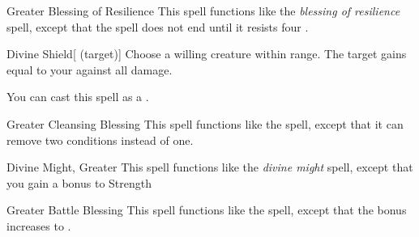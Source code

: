 \lowercase{\hypertarget{spell:Greater Blessing of Resilience}{}}\label{spell:Greater Blessing of Resilience}
\begin{ability}[\nth{3}]{\hypertarget{spell:Greater Blessing of Resilience}{Greater Blessing of Resilience}}
This spell functions like the \textit{blessing of resilience} spell, except that the spell does not end until it resists four .
\end{ability}
\vspace{0.25em}



\lowercase{\hypertarget{spell:Divine Shield}{}}\label{spell:Divine Shield}
\begin{ability}[\nth{4}]{\hypertarget{spell:Divine Shield}{Divine Shield}}[ (target)]
Choose a willing creature within \rngclose range.
The target gains  equal to your  against all damage.

You can cast this spell as a .
\end{ability}
\vspace{0.25em}



\lowercase{\hypertarget{spell:Greater Cleansing Blessing}{}}\label{spell:Greater Cleansing Blessing}
\begin{ability}[\nth{4}]{\hypertarget{spell:Greater Cleansing Blessing}{Greater Cleansing Blessing}}
This spell functions like the  spell, except that it can remove two conditions instead of one.
\end{ability}
\vspace{0.25em}



\lowercase{\hypertarget{spell:Divine Might, Greater}{}}\label{spell:Divine Might, Greater}
\begin{ability}[\nth{5}]{\hypertarget{spell:Divine Might, Greater}{Divine Might, Greater}}
This spell functions like the \textit{divine might} spell, except that you gain a  bonus to Strength
\end{ability}
\vspace{0.25em}



\lowercase{\hypertarget{spell:Greater Battle Blessing}{}}\label{spell:Greater Battle Blessing}
\begin{ability}[\nth{5}]{\hypertarget{spell:Greater Battle Blessing}{Greater Battle Blessing}}
This spell functions like the  spell, except that the bonus increases to .
\end{ability}
\vspace{0.25em}



